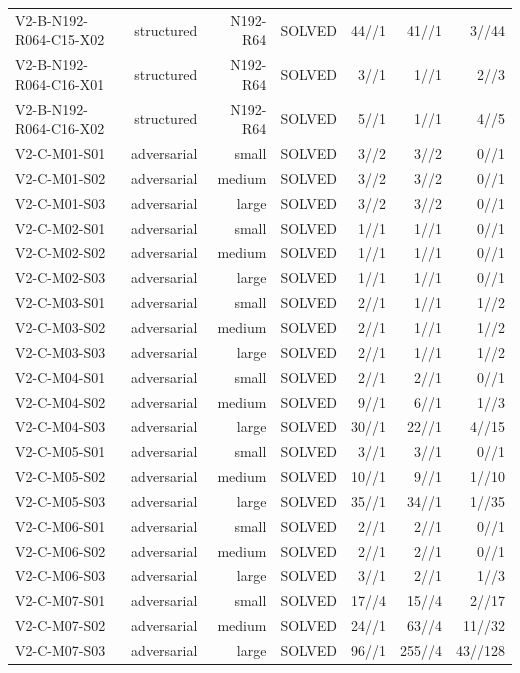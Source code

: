 {\begin{longtable}{lrrrrrr}
V2-B-N192-R064-C15-X02 & structured & N192-R64 & SOLVED & 44//1 & 41//1 & 3//44 \\
V2-B-N192-R064-C16-X01 & structured & N192-R64 & SOLVED & 3//1 & 1//1 & 2//3 \\
V2-B-N192-R064-C16-X02 & structured & N192-R64 & SOLVED & 5//1 & 1//1 & 4//5 \\
V2-C-M01-S01 & adversarial & small & SOLVED & 3//2 & 3//2 & 0//1 \\
V2-C-M01-S02 & adversarial & medium & SOLVED & 3//2 & 3//2 & 0//1 \\
V2-C-M01-S03 & adversarial & large & SOLVED & 3//2 & 3//2 & 0//1 \\
V2-C-M02-S01 & adversarial & small & SOLVED & 1//1 & 1//1 & 0//1 \\
V2-C-M02-S02 & adversarial & medium & SOLVED & 1//1 & 1//1 & 0//1 \\
V2-C-M02-S03 & adversarial & large & SOLVED & 1//1 & 1//1 & 0//1 \\
V2-C-M03-S01 & adversarial & small & SOLVED & 2//1 & 1//1 & 1//2 \\
V2-C-M03-S02 & adversarial & medium & SOLVED & 2//1 & 1//1 & 1//2 \\
V2-C-M03-S03 & adversarial & large & SOLVED & 2//1 & 1//1 & 1//2 \\
V2-C-M04-S01 & adversarial & small & SOLVED & 2//1 & 2//1 & 0//1 \\
V2-C-M04-S02 & adversarial & medium & SOLVED & 9//1 & 6//1 & 1//3 \\
V2-C-M04-S03 & adversarial & large & SOLVED & 30//1 & 22//1 & 4//15 \\
V2-C-M05-S01 & adversarial & small & SOLVED & 3//1 & 3//1 & 0//1 \\
V2-C-M05-S02 & adversarial & medium & SOLVED & 10//1 & 9//1 & 1//10 \\
V2-C-M05-S03 & adversarial & large & SOLVED & 35//1 & 34//1 & 1//35 \\
V2-C-M06-S01 & adversarial & small & SOLVED & 2//1 & 2//1 & 0//1 \\
V2-C-M06-S02 & adversarial & medium & SOLVED & 2//1 & 2//1 & 0//1 \\
V2-C-M06-S03 & adversarial & large & SOLVED & 3//1 & 2//1 & 1//3 \\
V2-C-M07-S01 & adversarial & small & SOLVED & 17//4 & 15//4 & 2//17 \\
V2-C-M07-S02 & adversarial & medium & SOLVED & 24//1 & 63//4 & 11//32 \\
V2-C-M07-S03 & adversarial & large & SOLVED & 96//1 & 255//4 & 43//128 \\
\bottomrule
\end{longtable}
}
